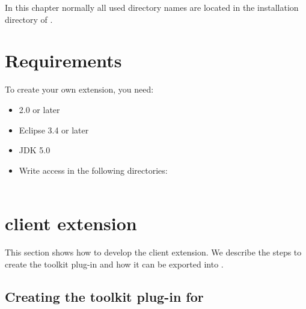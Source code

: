 In this chapter normally all used directory names are located in the
installation directory of \app{}.

\section{Requirements}
To create your own \app{} extension, you need:
\begin{itemize}
\item \app{} 2.0 or later
\item Eclipse 3.4 or later
\item JDK 5.0
\item Write access in the following directories:\\
\\
\end{itemize}

\section{\app{} client extension}
\label{clientExtension}

This section shows how to develop the \app{} client extension. We describe the
steps to create the toolkit plug-in and how it can be exported into \app{}.

\subsection{Creating the toolkit plug-in for \app{}}

